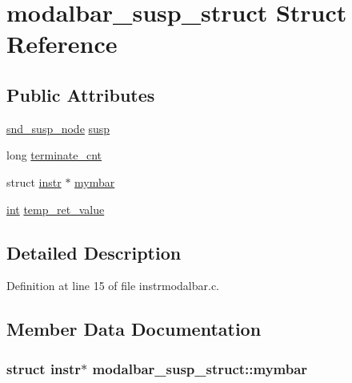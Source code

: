 \hypertarget{structmodalbar__susp__struct}{}\section{modalbar\+\_\+susp\+\_\+struct Struct Reference}
\label{structmodalbar__susp__struct}
\subsection*{Public Attributes}
\begin{DoxyCompactItemize}
\item 
\hyperlink{sound_8h_a6b268203688a934bd798ceb55f85d4c0}{snd\+\_\+susp\+\_\+node} \hyperlink{structmodalbar__susp__struct_a0e54bcf6273e7e35b64d6ada49dbf9a7}{susp}
\item 
long \hyperlink{structmodalbar__susp__struct_a71ec387a93570291d4ef40818f2bd73f}{terminate\+\_\+cnt}
\item 
struct \hyperlink{structinstr}{instr} $\ast$ \hyperlink{structmodalbar__susp__struct_a0c3e6a8054eb638f449e3bac66606ec9}{mymbar}
\item 
\hyperlink{xmltok_8h_a5a0d4a5641ce434f1d23533f2b2e6653}{int} \hyperlink{structmodalbar__susp__struct_a756eb6dccabdf349ba135841a540d237}{temp\+\_\+ret\+\_\+value}
\end{DoxyCompactItemize}


\subsection{Detailed Description}


Definition at line 15 of file instrmodalbar.\+c.



\subsection{Member Data Documentation}
\subsubsection[{\texorpdfstring{mymbar}{mymbar}}]{\setlength{\rightskip}{0pt plus 5cm}struct {\bf instr}$\ast$ modalbar\+\_\+susp\+\_\+struct\+::mymbar}\hypertarget{structmodalbar__susp__struct_a0c3e6a8054eb638f449e3bac66606ec9}{}\label{structmodalbar__susp__struct_a0c3e6a8054eb638f449e3bac66606ec9}


